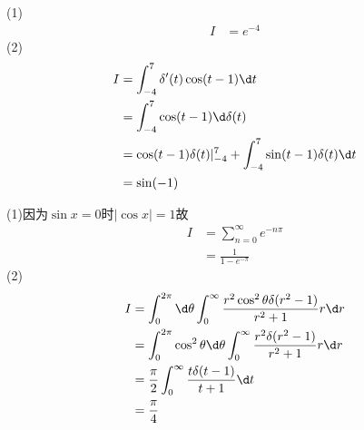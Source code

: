\documentclass{phyasgn}
\begin{document}
\begin{sol}[5]
    (1)\begin{align*}
        I&=e^{-4}
    \end{align*}
    (2)\begin{align*}
        I&=\int_{-4}^{7}\delta'(t)\cos(t-1)\d t\\
        &=\int_{-4}^{7}\cos(t-1)\d \delta(t)\\
        &=\cos(t-1)\delta(t)|_{-4}^{7}+\int_{-4}^{7}\sin(t-1)\delta(t)\d t\\
        &=\sin(-1)
    \end{align*}
\end{sol}\par

\begin{sol}[6]
    (1)因为$\sin x=0$时$|\cos x|=1$故
    \begin{align*}
        I&=\sum_{n=0}^{\infty}e^{-n\pi}\\
        &=\frac{1}{1-e^{-\pi}}
    \end{align*}
    (2)\begin{align*}
        I&=\int_{0}^{2\pi}\d \theta\int_{0}^{\infty}\frac{r^2\cos^2\theta\delta(r^2-1)}{r^2+1}r\d r\\
        &=\int_{0}^{2\pi}\cos^2\theta\d \theta\int_{0}^{\infty}\frac{r^2\delta(r^2-1)}{r^2+1}r\d r\\
        &=\frac{\pi}{2}\int_{0}^{\infty}\frac{t\delta(t-1)}{t+1}\d t\\
        &=\frac{\pi}{4}
    \end{align*}
\end{sol}\par
\end{document}
